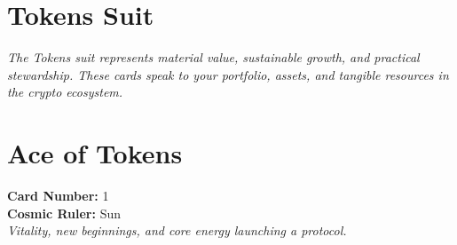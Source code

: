 \documentclass[11pt,oneside]{book}
\begin{document}
\section*{Tokens Suit}

\textit{The Tokens suit represents material value, sustainable growth, and practical stewardship. These cards speak to your portfolio, assets, and tangible resources in the crypto ecosystem.}

\newpage
\section*{Ace of Tokens}

\begin{minipage}[t]{0.55\textwidth}
  \vspace{0pt}
  \textbf{Card Number:} 1\\  \textbf{Cosmic Ruler:} Sun\\  \textit{Vitality, new beginnings, and core energy launching a protocol.}
\end{minipage}
\end{document}
